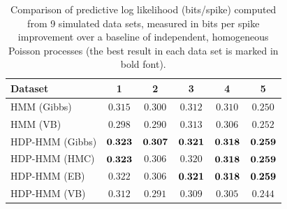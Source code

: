 \begin{table}
  \centering
  \caption[Comparison of predictive log likelihood on synthetic
    data]{Comparison of predictive log likelihood (bits/spike)
    computed from 9 simulated data sets, measured in bits per spike
    improvement over a baseline of independent, homogeneous Poisson
    processes (the best result in each data set is marked in bold
    font). }
  \begin{tabular}{l|ccccc}
    Dataset & 1 & 2 & 3 & 4 & 5 \\
    \hline
    HMM (Gibbs)     & $0.315$      & $0.300$ & $0.312$ & $0.310$ & $0.250$ \\
    HMM (VB)        & $0.298$      & $0.290$ & $0.313$ & $0.306$ & $0.252$ \\ 
    HDP-HMM (Gibbs) & $\bf{0.323}$ & $\bf{0.307}$ & $\bf{0.321}$ & $\bf{0.318}$ & $\bf{0.259}$ \\
    HDP-HMM (HMC)   & $\bf{0.323}$ & $0.306$ & $0.320$ & $\bf{0.318}$ & $\bf{0.259}$ \\
    HDP-HMM (EB)    & $0.322$      & $0.306$ & $\bf{0.321}$ & $\bf{0.318}$ & $\bf{0.259}$ \\
    HDP-HMM (VB)    & $0.312$      & $0.291$ & $0.309$ & $0.305$ & $0.244$ \\
    \hline
  \end{tabular}
  \label{tab:synth_pll}
\end{table}

